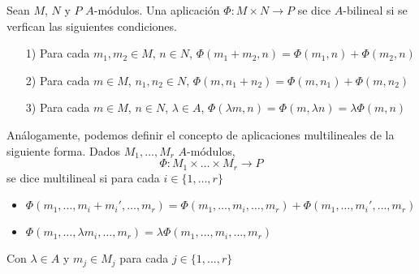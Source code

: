 \documentclass[../main.tex]{subfiles}
\begin{document}
\begin{definition} Sean $M$, $N$ y $P$ $A$-módulos. Una aplicación $\Phi:M\times N\longrightarrow P$ se dice $A$-bilineal si se verfican las siguientes condiciones.
\begin{itemize}
    \item [1)] Para cada $m_1,m_2\in M$, $n\in N$, $\Phi(m_1+m_2,n)=\Phi(m_1,n)+\Phi(m_2,n)$
    \item [2)] Para cada $m\in M$, $n_1,n_2\in N$, $\Phi(m,n_1+n_2)=\Phi(m,n_1)+\Phi(m,n_2)$
    \item [3)] Para cada $m\in M$, $n\in N$, $\lambda\in A$, $\Phi(\lambda m,n)=\Phi(m,\lambda n)=\lambda\Phi(m,n)$
\end{itemize}
\end{definition}
\begin{remark} Análogamente, podemos definir el concepto de aplicaciones multilineales de la siguiente forma. Dados $M_1,\dots ,M_r$ $A$-módulos,$$\Phi:M_1\times\dots\times M_r\longrightarrow P$$ se dice multilineal si para cada $i\in\{1,\dots,r\}$\begin{itemize}
    \item $\Phi(m_1,\dots,m_i+m_i',\dots,m_r)=\Phi(m_1,\dots,m_i,\dots,m_r)+\Phi(m_1,\dots,m_i',\dots,m_r)$
    \item $\Phi(m_1,\dots,\lambda m_i,\dots,m_r)=\lambda\Phi(m_1,\dots,m_i,\dots,m_r)$
\end{itemize}
Con $\lambda\in A$ y $m_j\in M_j$ para cada $j\in\{1,\dots,r\}$
\end{remark}
\end{document}
